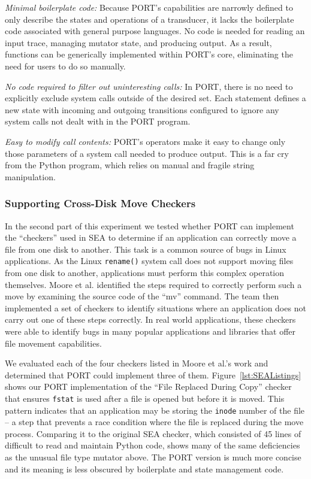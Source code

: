 \textit{Minimal boilerplate code:} Because PORT's capabilities are narrowly defined to
only describe the states and operations of a transducer, it lacks the boilerplate
code associated with general purpose languages. No code is needed for 
reading an input trace, managing mutator state, and producing output.
As a result,
functions can be generically implemented within PORT's core, eliminating
the need for users to do so manually.

\textit{No code required to filter out uninteresting calls:}
In PORT, there is no
need to explicitly exclude system
calls outside of the desired set.  Each statement defines a new state with
incoming and outgoing transitions configured to ignore any system calls not
dealt with in the PORT program.

\textit{Easy to modify call contents:}  PORT's operators make it
easy to change only those parameters  of a system call
 needed to produce output.
This is a far cry
from the Python program, which relies on manual and fragile string manipulation.

\subsubsection{Supporting Cross-Disk Move Checkers}

In the second part of this experiment we tested whether PORT can
implement the ``checkers'' used in SEA to determine if an
application can correctly move a file from one disk to another.
This task is a common source of bugs in Linux applications. As the
Linux
{\tt rename()} system call does not support moving files from one disk to
another,
applications must perform this complex
operation themselves.
Moore et al. identified the steps required to
correctly perform such a move by examining the source code of the ``mv''
command. The team then implemented a set of checkers to identify situations where an application does not carry out one
of these steps correctly. 
In real world applications,
these checkers were able to identify bugs
in many popular applications and libraries that offer file movement
capabilities.

We evaluated each of the four checkers listed in Moore et al.'s work and
determined that PORT could implement three of them.
Figure~\ref{lst:SEAListings} shows our PORT implementation of
the ``File Replaced During Copy'' checker
that ensures {\tt fstat} is used after a file is opened but
before it is moved.  This pattern indicates that an application may be
storing the {\tt inode} number of the file -- a step that prevents a race
condition where the file is replaced during the move process.
Comparing it to the
original SEA checker,
which consisted of 45 lines of difficult to read and maintain Python code,
shows many of the same deficiencies as the unusual file type
mutator above.
The PORT version is much more concise and its meaning is
less obscured by boilerplate and state management code.

